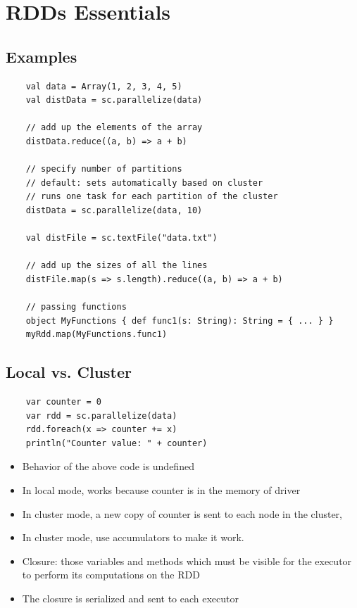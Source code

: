 \section{RDDs Essentials}

\subsection{Examples}
\begin{frame}[fragile]
\begin{lstlisting}
	val data = Array(1, 2, 3, 4, 5)
	val distData = sc.parallelize(data)
	
	// add up the elements of the array
	distData.reduce((a, b) => a + b)
	
	// specify number of partitions
	// default: sets automatically based on cluster
	// runs one task for each partition of the cluster
	distData = sc.parallelize(data, 10) 
	
	val distFile = sc.textFile("data.txt")
	
	// add up the sizes of all the lines
	distFile.map(s => s.length).reduce((a, b) => a + b)
	
	// passing functions
	object MyFunctions { def func1(s: String): String = { ... } }
	myRdd.map(MyFunctions.func1)
\end{lstlisting}
\end{frame}

\subsection{Local vs. Cluster}
\begin{frame}[fragile]
\begin{lstlisting}
	var counter = 0
	var rdd = sc.parallelize(data)
	rdd.foreach(x => counter += x)	
	println("Counter value: " + counter)
\end{lstlisting}
\begin{itemize}
  \item Behavior of the above code is undefined
  \item In local mode, works because counter is in the memory of driver
  \item In cluster mode, a new copy of counter is sent to each node in the
  cluster,
  \item In cluster mode, use accumulators to make it work.
  \item Closure: those variables and methods which must be visible for the
  executor to perform its computations on the RDD
  \item The closure is serialized and sent to each executor
\end{itemize}
\end{frame}

